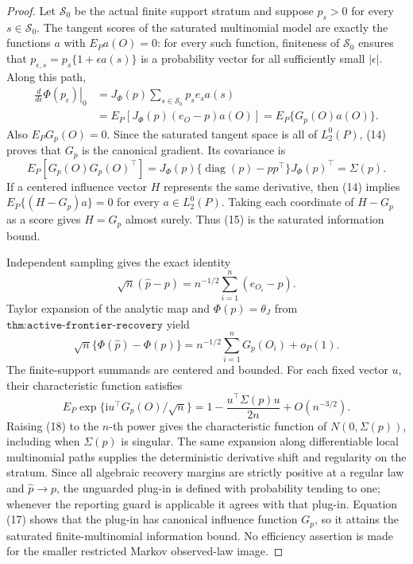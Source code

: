 \documentclass{article}
\begin{document}
\begin{proof}
Let \(\mathcal S_0\) be the actual finite support stratum and suppose \(p_s>0\) for every \(s\in\mathcal S_0\).  The tangent scores of the saturated multinomial model are exactly the functions \(a\) with \(E_Pa(O)=0\): for every such function, finiteness of \(\mathcal S_0\) ensures that \(p_{\epsilon,s}=p_s\{1+\epsilon a(s)\}\) is a probability vector for all sufficiently small \(|\epsilon|\).  Along this path,
\[
\begin{aligned}
 \left.\frac{d}{d\epsilon}\Phi(p_\epsilon)\right|_0
 &=J_\Phi(p)\sum_{s\in\mathcal S_0}p_se_sa(s)\\
 &=E_P\!\left[J_\Phi(p)(e_O-p)a(O)\right]
 =E_P\{G_p(O)a(O)\}.
\end{aligned}
\tag{14}
\]
Also \(E_PG_p(O)=0\).  Since the saturated tangent space is all of \(L_2^0(P)\), (14) proves that \(G_p\) is the canonical gradient.  Its covariance is
\[
 E_P[G_p(O)G_p(O)^\top]
 =J_\Phi(p)\{\operatorname{diag}(p)-pp^\top\}J_\Phi(p)^\top
 =\Sigma(p).
\tag{15}
\]
If a centered influence vector \(H\) represents the same derivative, then (14) implies \(E_P\{(H-G_p)a\}=0\) for every \(a\in L_2^0(P)\).  Taking each coordinate of \(H-G_p\) as a score gives \(H=G_p\) almost surely.  Thus (15) is the saturated information bound.

Independent sampling gives the exact identity
\[
 \sqrt n(\widehat p-p)=n^{-1/2}\sum_{i=1}^n(e_{O_i}-p).
\tag{16}
\]
Taylor expansion of the analytic map and \(\Phi(p)=\theta_J\) from \(\texttt{thm:active-frontier-recovery}\) yield
\[
 \sqrt n\{\Phi(\widehat p)-\Phi(p)\}
 =n^{-1/2}\sum_{i=1}^nG_p(O_i)+o_P(1).
\tag{17}
\]
The finite-support summands are centered and bounded.  For each fixed vector \(u\), their characteristic function satisfies
\[
 E_P\exp\{\mathrm i u^\top G_p(O)/\sqrt n\}
 =1-\frac{u^\top\Sigma(p)u}{2n}+O(n^{-3/2}).
\tag{18}
\]
Raising (18) to the \(n\)-th power gives the characteristic function of \(N(0,\Sigma(p))\), including when \(\Sigma(p)\) is singular.  The same expansion along differentiable local multinomial paths supplies the deterministic derivative shift and regularity on the stratum.  Since all algebraic recovery margins are strictly positive at a regular law and \(\widehat p\to p\), the unguarded plug-in is defined with probability tending to one; whenever the reporting guard is applicable it agrees with that plug-in.  Equation (17) shows that the plug-in has canonical influence function \(G_p\), so it attains the saturated finite-multinomial information bound.  No efficiency assertion is made for the smaller restricted Markov observed-law image.
\end{proof}
\end{document}
